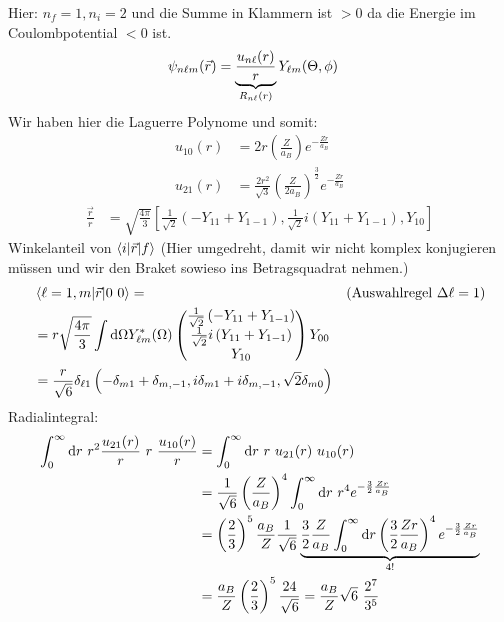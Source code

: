 	Hier: $n_f = 1, n_i = 2$ und die Summe in Klammern ist $>0$ da die Energie im Coulombpotential $<0$ ist.
		\begin{align*}
			\psi_{n \ell m} (\vec{r}) &= 
			\underbrace{\frac{u_{n \ell} (r)}{r}}_{\mathclap{R_{n \ell} (r)}}
			Y_{\ell m} (\Theta, \phi)
		\end{align*}
	Wir haben hier die Laguerre Polynome und somit:
		\begin{align*}
			u_{10} (r) &=
			2r \left(\frac{Z}{a_B}\right) e^{-\frac{Z r}{a_B}} \\
			u_{21} (r) &=
			\frac{2 r^2}{\sqrt{3}} \left(\frac{Z}{2 a_B}\right)^{\frac{3}{2}} e^{-\frac{Zr}{a_B}}
		\end{align*}
		\begin{align*}
			\frac{\vec{r}}{r} &=
			\sqrt{\frac{4\pi}{3}} 
			\left[
				\frac{1}{\sqrt{2}} \left(- Y_{11} + Y_{1-1}\right),
				\frac{1}{\sqrt{2}} i\left(Y_{11} + Y_{1-1}\right),
				Y_{10}
			\right]
		\end{align*}
	Winkelanteil von $\braket{i | \vec{r} | f}$ (Hier umgedreht, damit wir nicht komplex konjugieren müssen und wir den Braket sowieso ins Betragsquadrat nehmen.)
		\begin{align*}
			&\braket{\ell = 1, m | \vec{r} | 0~0} = & 
			&(\text{Auswahlregel~} \Delta \ell = 1) \\
			&= r \sqrt{\frac{4 \pi}{3}} \int \mathrm{d} \Omega Y_{\ell m}^* (\Omega)
			\begin{pmatrix}
			\frac{1}{\sqrt{2}} \left(- Y_{11} + Y_{1-1}\right) \\
			\frac{1}{\sqrt{2}} i\left(Y_{11} + Y_{1-1}\right) \\
			Y_{10} \\
			\end{pmatrix}
			Y_{00}\\
			&= \frac{r}{\sqrt{6}} \delta_{\ell 1}
			\left( -\delta_{m1} + \delta_{m,-1}, i\delta_{m1} + i\delta_{m,-1}, \sqrt{2} \delta_{m0}
			\right)
		\end{align*}
	Radialintegral: 
		\begin{align*}
			\int_{0}^{\infty} \diff r ~r^2 \frac{u_{21} (r)}{r} ~r~ \frac{u_{10} (r)}{r} &=
			\int_{0}^{\infty} \diff r ~r~ u_{21} (r) ~ u_{10} (r) \\
			&= \frac{1}{\sqrt{6}} \left(\frac{Z}{a_B}\right)^4 
			\int_{0}^{\infty} \diff r ~r^4 e^{- \frac{3}{2} \frac{Zr}{a_B}} \\
			&= \left(\frac{2}{3}\right)^5 \frac{a_B}{Z} \frac{1}{\sqrt{6}}
			\underbrace{\frac{3}{2} \frac{Z}{a_B}
				\int_{0}^{\infty} \diff r \left(\frac{3}{2} \frac{Zr}{a_B}\right)^4
				e^{-\frac{3}{2} \frac{Zr}{a_B}}}_{\mathclap{4!}} \\
			&= \frac{a_B}{Z} \left(\frac{2}{3}\right)^5 \frac{24}{\sqrt{6}} 
			= \frac{a_B}{Z} \sqrt{6} ~\frac{2^7}{3^5}
		\end{align*}
